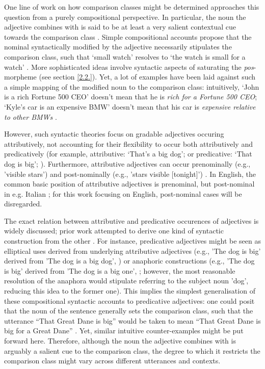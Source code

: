 One line of work on how comparison classes might be determined approaches this question from a purely compositional perspective. In particular, the noun the adjective combines with is said to be at least a very salient contextual cue towards the comparison class \parencite{Kamp1975}. 
Simple compositional accounts propose that the nominal syntactically modified by the adjective necessarily stipulates the comparison class, such that ‘small watch’ resolves to ‘the watch is small for a watch’ \parencite{Kamp1975, Cresswell1976}. More sophisticated ideas involve syntactic aspects of saturating the \textit{pos}-morpheme (see section \ref{2.2.}).
Yet, a lot of examples have been laid against such a simple mapping of the modified noun to the comparison class: intuitively, ‘John is a rich Fortune 500 CEO’ doesn’t mean that he is \emph{rich for a Fortune 500 CEO}; ‘Kyle’s car is an expensive BMW’ doesn’t mean that his car is \emph{expensive relative to other BMWs} \parencite{Kennedy2007}. 

However, such syntactic theories focus on gradable adjectives occuring attributively, not accounting for their flexibility to occur both attributively and predicatively (for example, attributive: ‘That’s a big dog’; or predicative: ‘That dog is big’; \textcite[cf.][]{mcnally2008, hofherr2010adjectives}). Furthermore, attributive adjectives can occur prenominally (e.g., 'visible stars') and post-nominally (e.g., 'stars visible [tonight]') \parencite{hofherr2010adjectives}. In English, the common basic position of attributive adjectives is prenominal, but post-nominal in e.g. Italian \parencite{cinque2010}; for this work focusing on English, post-nominal cases will be disregarded. 
  
The exact relation between attributive and predicative occurences of adjectives is widely discussed; prior work attempted to derive one kind of syntactic construction from the other \parencite[e.g.,][]{Cresswell1976}. For instance, predicative adjectives might be seen as elliptical uses derived from underlying attributive adjectives (e.g., 'The dog is big' derived from 'The dog is a big dog', \textcite[cf.][]{Kamp1975}) or anaphoric constructions (e.g., 'The dog is big' derived from 'The dog is a big one', \textcite[cf.][]{goldberg2017one}; however, the most reasonable resolution of the anaphora would stipulate referring to the subject noun 'dog', reducing this idea to the former one). 
This implies the simplest generalisation of these compositional syntactic accounts to predicative adjectives: one could posit that the noun of the sentence generally sets the comparison class, such that the utterance “That Great Dane is big” would be taken to mean “That Great Dane is big for a Great Dane” \parencite{tessler2020}. Yet, similar intuitive counter-examples might be put forward here. 
Therefore, although the noun the adjective combines with is arguably a salient cue to the comparison class, the degree to which it restricts the comparison class might vary across different utterances and contexts.   


